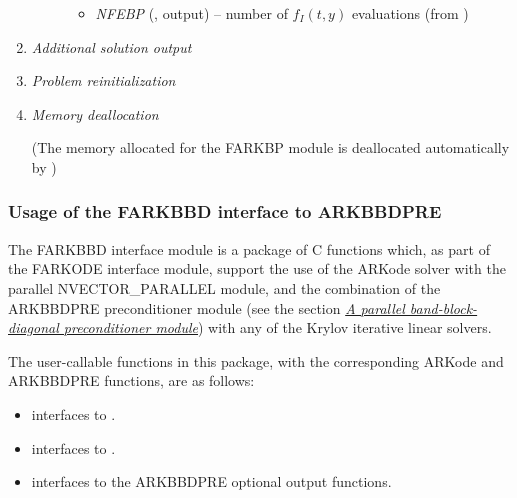 \documentclass[letterpaper,10pt,english]{sphinxmanual}
\begin{document}
\begin{enumerate}
\begin{fulllineitems}
\begin{description}
\begin{itemize}
\item {} 
\emph{NFEBP} (, output) -- number of
$f_I(t,y)$ evaluations (from
{\hyperref[c_interface/Preconditioners:ARKBandPrecGetNumRhsEvals]{}})

\end{itemize}

\end{description}

\end{fulllineitems}


\item {} 
\emph{Additional solution output}

\item {} 
\emph{Problem reinitialization}

\item {} 
\emph{Memory deallocation}

(The memory allocated for the FARKBP module is deallocated
automatically by {\hyperref[f_interface/Usage:f/_/FARKFREE]{}})

\end{enumerate}


\subsubsection{Usage of the FARKBBD interface to ARKBBDPRE}
\label{f_interface/Preconditioning:usage-of-the-farkbbd-interface-to-arkbbdpre}\label{f_interface/Preconditioning:finterface-bbdpre}
The FARKBBD interface module is a package of C functions which, as
part of the FARKODE interface module, support the use of the ARKode
solver with the parallel NVECTOR\_PARALLEL module, and the combination
of the ARKBBDPRE preconditioner module (see the section
{\hyperref[c_interface/Preconditioners:cinterface-bbdpre]{\emph{A parallel band-block-diagonal preconditioner module}}}) with any of the Krylov iterative linear
solvers.

The user-callable functions in this package, with the corresponding
ARKode and ARKBBDPRE functions, are as follows:
\begin{itemize}
\item {} 
{\hyperref[f_interface/Preconditioning:f/_/FARKBBDINIT]{}} interfaces to {\hyperref[c_interface/Preconditioners:ARKBBDPrecInit]{}}.

\item {} 
{\hyperref[f_interface/Preconditioning:f/_/FARKBBDREINIT]{}} interfaces to {\hyperref[c_interface/Preconditioners:ARKBBDPrecReInit]{}}.

\item {} 
{\hyperref[f_interface/Preconditioning:f/_/FARKBBDOPT]{}} interfaces to the ARKBBDPRE optional output
functions.

\end{itemize}
\end{document}
